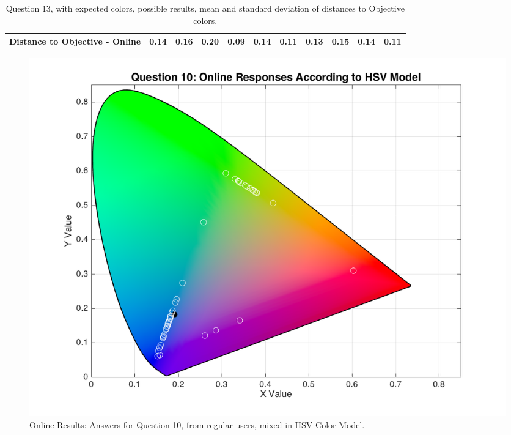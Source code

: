 \begin{table}[H]
{\begin{tabular}{lccccccccccccc}
    \multicolumn{4}{l}{Distance to Objective - Online}                                                                                               & \multicolumn{1}{|c}{0.14}        & \multicolumn{1}{c|}{0.16}    & \multicolumn{1}{|c}{0.20}        & \multicolumn{1}{c|}{0.09}    & \multicolumn{1}{|c}{0.14}       & \multicolumn{1}{c|}{0.11}    & \multicolumn{1}{|c}{\textbf{0.13}}        & \multicolumn{1}{c|}{0.15}    & \multicolumn{1}{|c}{0.14}       & \multicolumn{1}{c|}{0.11}    \\ \hline
    \end{tabular}}
  \caption[Question 13, with expected Results.]{Question 13, with expected colors, possible results, mean and standard deviation of distances to Objective colors.}
  \label{table:lab_q13_expected}
\end{table}
%
%
\begin{figure}[htbp]
  \centering
  \begin{minipage}{0.48\textwidth}
    \centering
    \includegraphics[width=\textwidth]{images/10_online_HSVresponses.png}
    \caption[Online Results: Answers for Question 10, from regular users, mixed in HSV Color Model.]{Online Results: Answers for Question 10, from regular users, mixed in HSV Color Model.}
    \label{fig:onlinehsvregular_10}
  \end{minipage}\hfill
  \begin{minipage}{0.48\textwidth}
    \centering

\end{minipage}
\end{figure}
